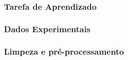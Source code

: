 \subsubsection{Tarefa de Aprendizado} \label{subsubsec:tarefa}


\subsubsection{Dados Experimentais} \label{subsubsec:dados}


\subsubsection{Limpeza e pré-processamento} \label{subsubsec:pre-process}
